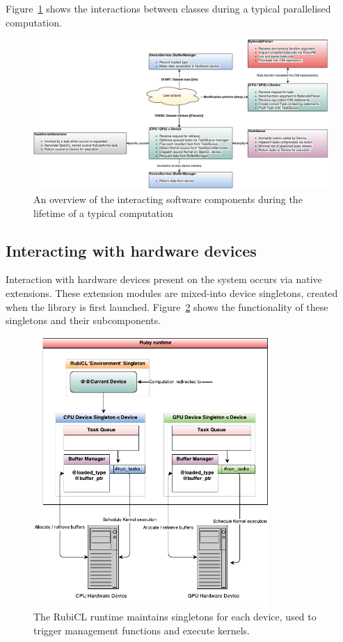 Figure~\ref{fig:rubicl_components} shows the interactions between classes during a typical parallelised computation.
\begin{figure}
  \includegraphics[width=\textwidth]{./figures/arch_components.pdf}
  \caption{An overview of the interacting software components during the lifetime of a typical computation}
  \label{fig:rubicl_components}
\end{figure}

\subsection{Interacting with hardware devices}
Interaction with hardware devices present on the system occurs via native extensions. These extension modules are mixed-into device singletons, created when the library is first launched. Figure~\ref{fig:rubicl_devices} shows the functionality of these singletons and their subcomponents.

\begin{figure}[h]
  \includegraphics[width=0.8\textwidth]{./figures/arch_diagram.pdf}
  \caption{The RubiCL runtime maintains singletons for each device, used to trigger management functions and execute kernels.}
  \label{fig:rubicl_devices}
\end{figure}

